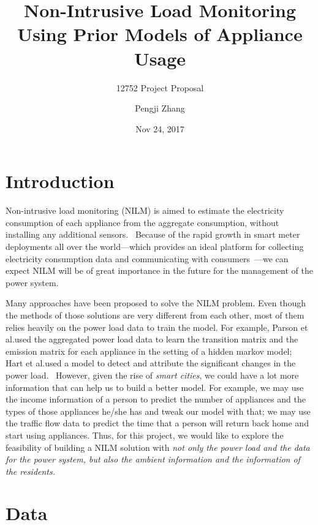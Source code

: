 \documentclass[11pt, letterpaper, headings=standardclasses]{scrartcl}
\begin{document}
\title{Non-Intrusive Load Monitoring Using Prior Models of
  Appliance Usage}
\subtitle{12752 Project Proposal}
\author{Pengji Zhang}
\date{Nov 24, 2017}

\maketitle

\section{Introduction}

Non-intrusive load monitoring (NILM) is aimed to estimate the
electricity consumption of each appliance from the aggregate
consumption, without installing any additional
sensors.~\cite{hart1992nonintrusive} Because of the rapid growth in
smart meter deployments all over the world---which provides an ideal
platform for collecting electricity consumption data and communicating
with consumers~\cite{kim2011unsupervised, parson2012non}---we can
expect NILM will be of great importance in the future for the
management of the power system.~\cite{kim2011unsupervised}

Many approaches have been proposed to solve the NILM problem. Even
though the methods of those solutions are very different from each
other, most of them relies heavily on the power load data to train the
model. For example, Parson et al.\@ used the aggregated power load
data to learn the transition matrix and the emission matrix for each
appliance in the setting of a hidden markov
model;~\cite{parson2012non} Hart et al.\@ used a model to detect and
attribute the significant changes in the power
load.~\cite{hart1992nonintrusive} However, given the rise of
\emph{smart cities}, we could have a lot more information that can
help us to build a better model. For example, we may use the income
information of a person to predict the number of appliances and the
types of those appliances he/she has and tweak our model with that; we
may use the traffic flow data to predict the time that a person will
return back home and start using appliances. Thus, for this project,
we would like to explore the feasibility of building a NILM solution
with \emph{not only the power load and the data for the power system,
  but also the ambient information and the information of the
  residents.}

\section{Data}
\end{document}
